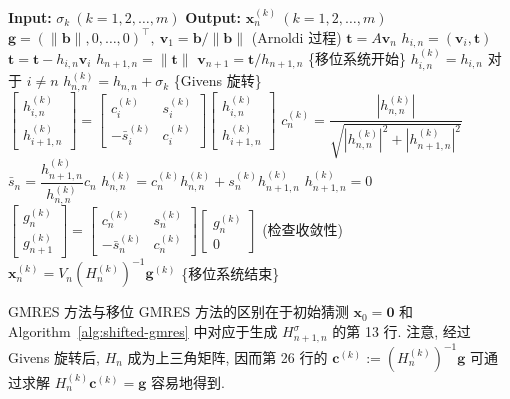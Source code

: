 \begin{algorithm}[H]\caption{{移位 GMRES 方法}}\label{alg:shifted-gmres}\begin{algorithmic}[1]
\Statex\textbf{Input:} $\sigma_k\ (k=1,2,\ldots,m)$
\Statex\textbf{Output:} $\bm x_n^{(k)}\ (k=1,2,\ldots,m)$
\State $\bm g=(\|\bm b\|,0,\ldots,0)^{\top},\ \bm v_1=\bm b/\|\bm b\|$
\State ({Arnoldi 过程})
\State $\bm t=A\bm v_n$
\State $h_{i,n}=(\bm v_i,\bm t)$
\State $\bm t=\bm t-h_{i,n}\bm v_i$
\EndFor
\State $h_{n+1,n}=\|\bm t\|$
\State $\bm v_{n+1}=\bm t/h_{n+1,n}$
\State \{{移位系统开始}\}
\State $h_{i,n}^{(k)}=h_{i,n}$ {对于} $i\ne n$
\State $h_{n,n}^{(k)}=h_{n,n}+\sigma_k$
\State \{{Givens 旋转}\}
\State $\begin{bmatrix}h_{i,n}^{(k)}\\h_{i+1,n}^{(k)}\end{bmatrix}=\begin{bmatrix}c_i^{(k)}&s_i^{(k)}\\-\bar s_i^{(k)}&c_i^{(k)}\end{bmatrix}\begin{bmatrix}h_{i,n}^{(k)}\\h_{i+1,n}^{(k)}\end{bmatrix}$
\EndFor
\State $c_n^{(k)}=\dfrac{|h_{n,n}^{(k)}|}{\sqrt{|h_{n,n}^{(k)}|^2+|h_{n+1,n}^{(k)}|^2}}$
\State $\bar s_n=\dfrac{h_{n+1,n}^{(k)}}{h_{n,n}^{(k)}}c_n$
\State $h_{n,n}^{(k)}=c_n^{(k)}h_{n,n}^{(k)}+s_n^{(k)}h_{n+1,n}^{(k)}$
\State $h_{n+1,n}^{(k)}=0$
\State $\begin{bmatrix}g_n^{(k)}\\g_{n+1}^{(k)}\end{bmatrix}=\begin{bmatrix}c_n^{(k)}&s_n^{(k)}\\-\bar s_n^{(k)}&c_n^{(k)}\end{bmatrix}\begin{bmatrix}g_n^{(k)}\\0\end{bmatrix}$
\State ({检查收敛性})
\State $\bm x_n^{(k)}=V_n(H_n^{(k)})^{-1}\bm g^{(k)}$
\EndIf\EndFor
\State \{{移位系统结束}\}
\EndFor\end{algorithmic}\end{algorithm}
{GMRES 方法与移位 GMRES 方法的区别在于初始猜测 $\bm x_0=\bm0$ 和 Algorithm\ \ref{alg:shifted-gmres} 中对应于生成 $H_{n+1,n}^{\sigma}$ 的第 13 行. 注意, 经过 Givens 旋转后, $H_n$ 成为上三角矩阵, 因而第 26 行的 $\bm c^{(k)}:=(H_n^{(k)})^{-1}\bm g$ 可通过求解 $H_n^{(k)}\bm c^{(k)}=\bm g$ 容易地得到.}
